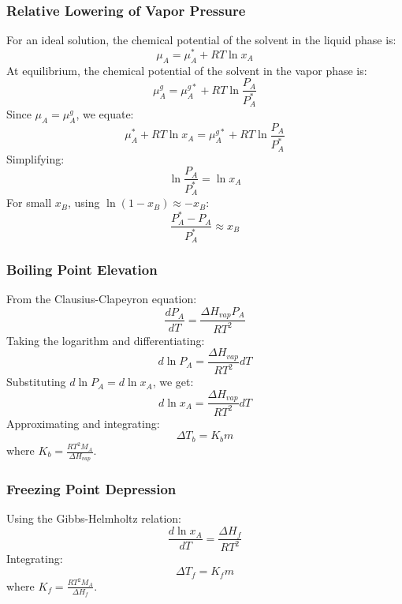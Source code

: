 \documentclass{article}
\theoremstyle{definition}
\begin{document}
\subsubsection{Relative Lowering of Vapor Pressure}
For an ideal solution, the chemical potential of the solvent in the liquid phase is:
\begin{equation}
    \mu_A = \mu_A^* + RT \ln x_A
\end{equation}
At equilibrium, the chemical potential of the solvent in the vapor phase is:
\begin{equation}
    \mu_A^g = \mu_A^{g*} + RT \ln \frac{P_A}{P_A^*}
\end{equation}
Since \( \mu_A = \mu_A^g \), we equate:
\begin{equation}
    \mu_A^* + RT \ln x_A = \mu_A^{g*} + RT \ln \frac{P_A}{P_A^*}
\end{equation}
Simplifying:
\begin{equation}
    \ln \frac{P_A}{P_A^*} = \ln x_A
\end{equation}
For small \( x_B \), using \( \ln(1 - x_B) \approx -x_B \):
\begin{equation}
    \frac{P_A^* - P_A}{P_A^*} \approx x_B
\end{equation}

\subsubsection{Boiling Point Elevation}
From the Clausius-Clapeyron equation:
\begin{equation}
    \frac{dP_A}{dT} = \frac{\Delta H_{vap} P_A}{RT^2}
\end{equation}
Taking the logarithm and differentiating:
\begin{equation}
    d \ln P_A = \frac{\Delta H_{vap}}{RT^2} dT
\end{equation}
Substituting \( d \ln P_A = d \ln x_A \), we get:
\begin{equation}
    d \ln x_A = \frac{\Delta H_{vap}}{RT^2} dT
\end{equation}
Approximating and integrating:
\begin{equation}
    \Delta T_b = K_b m
\end{equation}
where \( K_b = \frac{RT^2 M_A}{\Delta H_{vap}} \).

\subsubsection{Freezing Point Depression}
Using the Gibbs-Helmholtz relation:
\begin{equation}
    \frac{d \ln x_A}{dT} = \frac{\Delta H_f}{RT^2}
\end{equation}
Integrating:
\begin{equation}
    \Delta T_f = K_f m
\end{equation}
where \( K_f = \frac{RT^2 M_A}{\Delta H_f} \).
\end{document}
